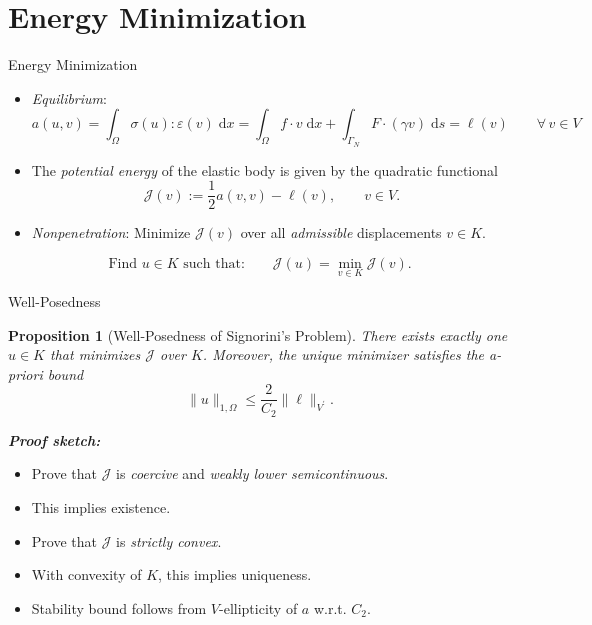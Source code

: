 \documentclass[10pt,aspectratio=169]{beamer}
\newtheorem{proposition}{Proposition}[section]
\def\cJ{{\mathcal J}}
\def\d{{\mathrm{d}}}
\def\dx{{\d x}}
\def\ds{{\d s}}
\begin{document}
\section{Energy Minimization}

\begin{frame}{Energy Minimization}
	\begin{itemize}
		\item {\em Equilibrium}:
		      \begin{equation*}
			      a(u,v) = \int_\Omega \sigma(u):\varepsilon(v)\;\dx = \int_\Omega f\cdot v\;\dx +\int_{\Gamma_N} F\cdot(\gamma v)\;\ds = \ell(v)\qquad \forall\, v\in V
		      \end{equation*}
		\item The {\em potential energy} of the elastic body is given by the quadratic functional
		      \begin{equation*}
			      \cJ(v):= \frac{1}{2}a(v,v)-\ell(v),\qquad v\in V.
		      \end{equation*}
		\item {\em Nonpenetration}: Minimize $\cJ(v)$ over all {\em admissible} displacements $v\in K$.
	\end{itemize}

	\begin{problem}
	\begin{equation*}
		\text{Find }u\in K\text{ such that:}\qquad \cJ(u) = \min_{v\in K}\cJ(v).
	\end{equation*}
	\end{problem}
\end{frame}

\begin{frame}{Well-Posedness}
	\begin{proposition}[Well-Posedness of Signorini's Problem]
		There exists exactly one $u\in K$ that minimizes $\cJ$ over $K$. Moreover, the unique minimizer satisfies the a-priori bound
		\begin{equation*}
			\|u\|_{1,\Omega} \le \frac{2}{C_2} \|\ell\|_{V^\prime}.
		\end{equation*}
	\end{proposition}
	\textbf{\em Proof sketch:}
	\begin{itemize}
		\item Prove that $\cJ$ is {\em coercive} and {\em weakly lower semicontinuous}.
		\item This implies existence.
		\item Prove that $\cJ$ is {\em strictly convex}.
		\item With convexity of $K$, this implies uniqueness.
		\item Stability bound follows from $V$-ellipticity of $a$ w.r.t. $C_2$.
	\end{itemize}
\end{frame}
\end{document}

